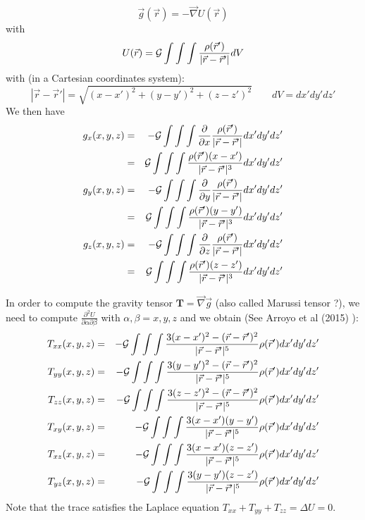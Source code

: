 
\[
\vec g (\vec r) = -\vec\nabla U (\vec r)
\]
with 
\[
U(\vec r) = {\cal G} \int\int\int \frac{\rho(\vec r')}{|\vec r-\vec r'|}dV
\]
with (in a Cartesian coordinates system):
\[
|\vec r-\vec r'|=\sqrt{(x-x')^2 + (y-y')^2 + (z-z')^2}
\qquad dV = dx'dy'dz'
\]
We then have 
\begin{eqnarray}
g_x (x,y,z) 
&=& - {\cal G} \int\int\int \frac{\partial }{\partial x} \frac{\rho(\vec r')}{|\vec r-\vec r'|}dx'dy'dz' \nonumber\\
&=&  {\cal G} \int\int\int \frac{\rho(\vec r') (x-x')}{|\vec r-\vec r'|^3}dx'dy'dz' \nonumber\\
g_y (x,y,z) 
&=& - {\cal G} \int\int\int \frac{\partial }{\partial y} \frac{\rho(\vec r')}{|\vec r-\vec r'|}dx'dy'dz' \nonumber\\
&=&  {\cal G} \int\int\int \frac{\rho(\vec r') (y-y')}{|\vec r-\vec r'|^3}dx'dy'dz' \nonumber\\
g_z (x,y,z) 
&=& - {\cal G} \int\int\int \frac{\partial }{\partial z} \frac{\rho(\vec r')}{|\vec r-\vec r'|}dx'dy'dz' \nonumber\\
&=&  {\cal G} \int\int\int \frac{\rho(\vec r') (z-z')}{|\vec r-\vec r'|^3}dx'dy'dz' \nonumber
\end{eqnarray}

In order to compute the gravity tensor ${\bm T}=\vec\nabla \vec g$
(also called Marussi tensor ?), 
we need to compute $\frac{\partial^2 U}{\partial \alpha \partial \beta}$ with $\alpha,\beta=x,y,z$
and we obtain (See Arroyo et al (2015) \cite{arct15}):
\begin{eqnarray}
T_{xx}(x,y,z)&=& -{\cal G} \int\int\int \frac{3(x-x')^2-({\vec r}-{\vec r}')^2}{|{\vec r}-{\vec r}'|^5} \rho({\vec r}') dx'dy'dz' \\
T_{yy}(x,y,z)&=& -{\cal G} \int\int\int \frac{3(y-y')^2-({\vec r}-{\vec r}')^2}{|{\vec r}-{\vec r}'|^5} \rho({\vec r}') dx'dy'dz' \\
T_{zz}(x,y,z)&=& -{\cal G} \int\int\int \frac{3(z-z')^2-({\vec r}-{\vec r}')^2}{|{\vec r}-{\vec r}'|^5} \rho({\vec r}') dx'dy'dz' \\
T_{xy}(x,y,z)&=& -{\cal G} \int\int\int \frac{3(x-x')(y-y')}{|{\vec r}-{\vec r}'|^5}  \rho({\vec r}') dx'dy'dz' \\
T_{xz}(x,y,z)&=& -{\cal G} \int\int\int \frac{3(x-x')(z-z')}{|{\vec r}-{\vec r}'|^5}  \rho({\vec r}') dx'dy'dz' \\
T_{yz}(x,y,z)&=& -{\cal G} \int\int\int \frac{3(y-y')(z-z')}{|{\vec r}-{\vec r}'|^5}  \rho({\vec r}') dx'dy'dz' 
\end{eqnarray}
Note that the trace satisfies the Laplace equation $T_{xx}+T_{yy}+T_{zz}=\Delta U = 0$.

